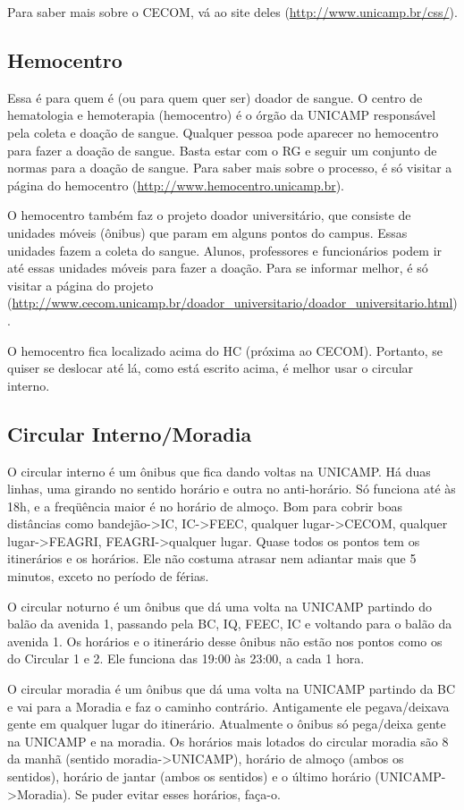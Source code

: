 Para saber mais sobre o CECOM, vá ao site deles
(\url{http://www.unicamp.br/css/}).

\subsection{Hemocentro}
Essa é para quem é (ou para quem quer ser) doador de sangue. O centro de
hematologia e hemoterapia (hemocentro) é o órgão da UNICAMP responsável pela
coleta e doação de sangue. Qualquer pessoa pode aparecer no hemocentro para
fazer a doação de sangue. Basta estar com o RG e seguir um conjunto de normas
para a doação de sangue. Para saber mais sobre o processo, é só visitar a página
do hemocentro (\url{http://www.hemocentro.unicamp.br}).

O hemocentro também faz o projeto doador universitário, que consiste de unidades
móveis (ônibus) que param em alguns pontos do campus. Essas unidades fazem
a coleta do sangue. Alunos, professores e funcionários podem ir até essas
unidades móveis para fazer a doação. Para se informar melhor, é só visitar
a página do projeto
(\url{http://www.cecom.unicamp.br/doador_universitario/doador_universitario.html}).

O hemocentro fica localizado acima do HC (próxima ao CECOM). Portanto, se quiser
se deslocar até lá, como está escrito acima, é melhor usar o circular interno.

\subsection{Circular Interno/Moradia}
O circular interno é um ônibus que fica dando voltas na UNICAMP. Há duas linhas,
uma girando no sentido horário e outra no anti-horário. Só funciona até às 18h,
e a freqüência maior é no horário de almoço. Bom para cobrir boas distâncias
como bandejão->IC, IC->FEEC, qualquer lugar->CECOM, qualquer lugar->FEAGRI,
FEAGRI->qualquer lugar. Quase todos os pontos tem os itinerários e os horários.
Ele não costuma atrasar nem adiantar mais que 5 minutos, exceto no período de
férias.

O circular noturno é um ônibus que dá uma volta na UNICAMP partindo do balão da
avenida 1, passando pela BC, IQ, FEEC, IC e voltando para o balão da avenida 1.
Os horários e o itinerário desse ônibus não estão nos pontos como os do Circular
1 e 2. Ele funciona das 19:00 às 23:00, a cada 1 hora.

O circular moradia é um ônibus que dá uma volta na UNICAMP partindo da BC e vai
para a Moradia e faz o caminho contrário. Antigamente ele pegava/deixava gente
em qualquer lugar do itinerário. Atualmente o ônibus só pega/deixa gente na
UNICAMP e na moradia. Os horários mais lotados do circular moradia são 8 da
manhã (sentido moradia->UNICAMP), horário de almoço (ambos os sentidos), horário
de jantar (ambos os sentidos) e o último horário (UNICAMP->Moradia). Se puder
evitar esses horários, faça-o.

